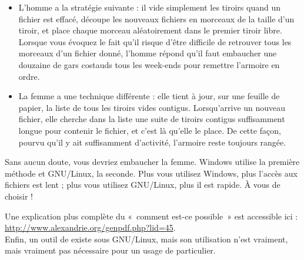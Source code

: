 \begin{itemize}
\item L'homme a la stratégie suivante : il vide simplement les tiroirs quand un fichier est effacé, découpe les nouveaux fichiers en morceaux de la taille d'un tiroir, et place chaque morceau aléatoirement dans le premier tiroir libre. Lorsque vous évoquez le fait qu'il risque d'être difficile de retrouver tous les morceaux d'un fichier donné, l'homme répond qu'il faut embaucher une douzaine de gars costauds tous les week-ends pour remettre l'armoire en ordre. 
\item La femme a une technique différente : elle tient à jour, sur une feuille de papier, la liste de tous les tiroirs vides contigus. Lorsqu'arrive un nouveau fichier, elle cherche dans la liste une suite de tiroirs contigus suffisamment longue pour contenir le fichier, et c'est là qu'elle le place. De cette façon, pourvu qu'il y ait suffisamment d'activité, l'armoire reste toujours rangée. 
\end{itemize}
Sans aucun doute, vous devriez embaucher la femme. Windows utilise la première méthode et GNU/Linux, la seconde. Plus vous utilisez Windows, plus l'accès aux fichiers est lent ; plus vous utilisez GNU/Linux, plus il est rapide. À vous de choisir !\par
\begin{nota}
Une explication plus complète du «~comment est-ce possible~» est accessible ici : \url{http://www.alexandrie.org/genpdf.php?lid=45}.\\
Enfin, un outil de  existe sous GNU/Linux, mais son utilisation n'est vraiment, mais vraiment pas nécessaire pour un usage de particulier.
\end{nota}
